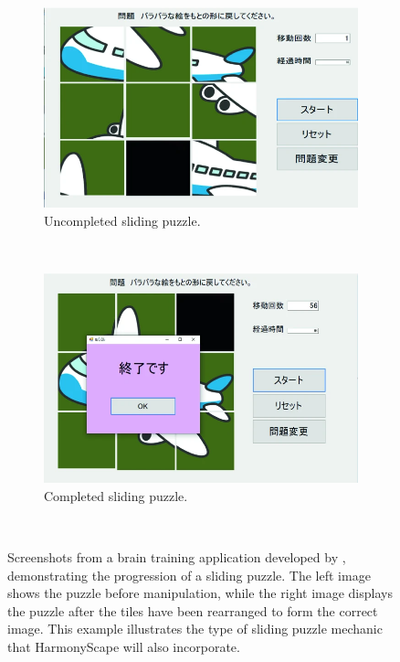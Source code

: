 \documentclass{l4proj}
\begin{document}
\begin{figure}[h]
    \centering
    \begin{subfigure}[b]{0.45\textwidth}
        \includegraphics[width=\textwidth]{dissertation/images/uncompleted_sliding.png}
        \caption{Uncompleted sliding puzzle.}
        \label{fig:slide_uncompleted}
    \end{subfigure}
    ~ 
    \begin{subfigure}[b]{0.45\textwidth}
        \includegraphics[width=\textwidth]{dissertation/images/completed_sliding.png}
        \caption{Completed sliding puzzle.}
        \label{fig:slide_completed}
    \end{subfigure}
    ~  
    \caption{Screenshots from a brain training application developed by \cite{sasaki_proposal_2020}, demonstrating the progression of a sliding puzzle. The left image shows the puzzle before manipulation, while the right image displays the puzzle after the tiles have been rearranged to form the correct image. This example illustrates the type of sliding puzzle mechanic that HarmonyScape will also incorporate.
    }\label{fig:sliding_puzzle}
\end{figure}
\end{document}
